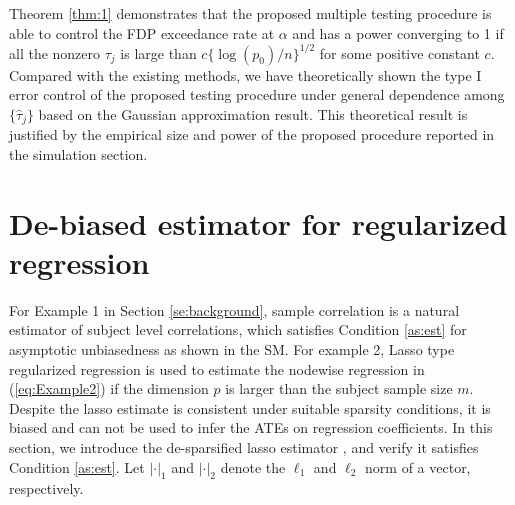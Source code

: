 \documentclass[12pt]{article}
\theoremstyle{definition}
\begin{document}
Theorem \ref{thm:1} demonstrates that the proposed multiple testing procedure is able to control the FDP exceedance rate at $\alpha$ and has a power converging to 1 if all the nonzero $\tau_j$ is large than $c \{\log(p_0) / n\}^{1/2}$ for some positive constant $c$.
Compared with the existing methods, we have theoretically shown the type I error control of the proposed testing procedure 
under general dependence among $\{\hat{\tau}_j\}$
based on the Gaussian approximation result.
This theoretical result is justified by 
the empirical size and power of the proposed procedure reported in the simulation section. 

\iffalse
\setcounter{equation}{0}
\section{De-biased estimator for regularized regression}\label{se:de-bias}

For Example 1 in Section \ref{se:background}, sample correlation is a natural estimator of subject level correlations, which satisfies Condition \ref{as:est} for asymptotic unbiasedness as shown in the SM. 
For example 2, Lasso type regularized regression is used to estimate the nodewise regression in (\ref{eq:Example2}) if the dimension $p$ is larger than the subject sample size $m$.
Despite the lasso estimate is consistent under suitable sparsity conditions, it is biased and can not be used to infer the ATEs on regression coefficients. 
In this section, we introduce the de-sparsified lasso estimator \citep{vanderGeerRitov2014, ZZ14}, and verify it satisfies Condition \ref{as:est}.
Let $|\cdot|_1$ and $|\cdot|_2$ denote the $\ell_1$ and $\ell_2$ norm of a vector, respectively.

\end{document}
